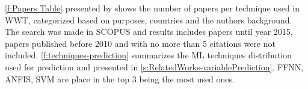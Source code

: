 \autoref{f:Papers Table} presented by \cite{Corominas2018} shows the number of papers per technique used in \ac{WWT}, categorized based on purposes, countries and  the authors background. The search was made in SCOPUS and results includes papers until year 2015, papers published before 2010 and with no more than 5 citations were not included. \autoref{f:techniques-prediction} summarizes the \ac{ML} techniques distribution used for prediction and presented in \autoref{s:RelatedWorks-variablePrediction}. \ac{FFNN}, \ac{ANFIS}, \ac{SVM} are place in the top 3 being the most used ones.

